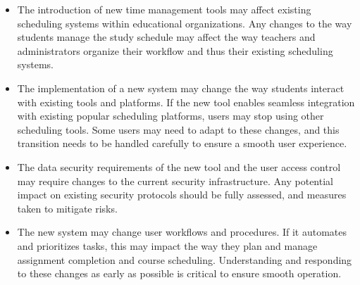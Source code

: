 \documentclass[12pt]{article}
\begin{document}
\begin{itemize}
    \item The introduction of new time management tools may affect existing scheduling systems within educational organizations. Any changes to the way students manage the study schedule may affect the way teachers and administrators organize their workflow and thus their existing scheduling systems.

    \item The implementation of a new system may change the way students interact with existing tools and platforms. If the new tool enables seamless integration with existing popular scheduling platforms, users may stop using other scheduling tools. Some users may need to adapt to these changes, and this transition needs to be handled carefully to ensure a smooth user experience.

    \item The data security requirements of the new tool and the user access control may require changes to the current security infrastructure. Any potential impact on existing security protocols should be fully assessed, and measures taken to mitigate risks.

    \item The new system may change user workflows and procedures. If it automates and prioritizes tasks, this may impact the way they plan and manage assignment completion and course scheduling. Understanding and responding to these changes as early as possible is critical to ensure smooth operation.
\end{itemize}
\end{document}
